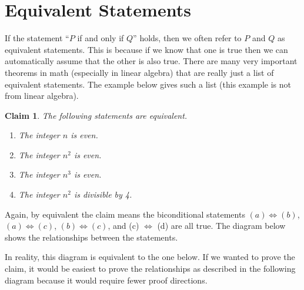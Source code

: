 \documentclass[12 pt]{article}
\theoremstyle{definition}
\theoremstyle{plain}
\theoremstyle{mytheorem}
\theoremstyle{myexample}
\newtheorem{claim}{Claim}
\theoremstyle{mydefinition}
\begin{document}
\section{Equivalent Statements}
If the statement ``$P$ if and only if $Q$'' holds, then we often refer to $P$ and $Q$ as equivalent statements.  This is because if we know that one is true then we can automatically assume that the other is also true.  There are many very important theorems in math (especially in linear algebra) that are really just a list of equivalent statements.  The example below gives such a list (this example is not from linear algebra).
\begin{claim}The following statements are equivalent.
	\begin{enumerate}[label=(\alph*)]
	\item The integer $n$ is even.
	\item The integer $n^2$ is even.
	\item The integer $n^3$ is even.
	\item The integer $n^2$ is divisible by 4.
	\end{enumerate}
\end{claim}
Again, by equivalent the claim means the biconditional statements $(a) \Leftrightarrow (b)$, $(a) \Leftrightarrow (c)$, $(b) \Leftrightarrow (c)$, and (c) $\Leftrightarrow$ (d) are all true.  The diagram below shows the relationships between the statements.

\begin{figure}[H]
\centering
{}
\end{figure}

In reality, this diagram is equivalent to the one below.  If we wanted to prove the claim, it would be easiest to prove the relationships as described in the following diagram because it would require fewer proof directions.

\begin{figure}[h]
\centering
{}
\end{figure}
\end{document}
